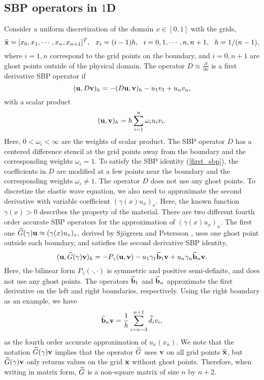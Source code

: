 \subsection{SBP operators in $1$D}\label{sec_sbp_1d}
Consider a uniform discretization of the domain $x\in[0,1]$ with the grids,
\[\widetilde
	{\bf x} = [x_0,x_1,\cdots,x_n,x_{n+1}]^T,\ \  x_i = (i-1)h,\ \ i = 0,1,\cdots,n,n+1,\ \ h = 1/(n-1),\]
where $i = 1,n$ correspond to the grid points on the boundary, and $i = 0,n+1$ are ghost points outside of the physical domain. The  operator $D \approx \frac{\partial }{\partial x}$ is a first derivative SBP operator \cite{Kreiss1974,Strand1994} if 
\begin{equation}\label{first_sbp}
({\bf u}, D{\bf v})_h = -(D{\bf u},{\bf v})_h - u_1v_1 + u_nv_n,
\end{equation}
with a scalar product
\begin{equation}\label{inner_product}
({\bf u},{\bf v})_h = h\sum_{i = 1}^{n}\omega_iu_iv_i.
\end{equation}
Here, $0<\omega_i < \infty $ are the weights of scalar product. The SBP operator $D$ has a centered difference stencil at the grid points away from the boundary and the corresponding weights $\omega_i = 1$. To satisfy the SBP identity (\ref{first_sbp}), the coefficients in $D$ are  modified at a few points near the boundary and the corresponding weights $\omega_i \neq 1$. The operator $D$ does not use any ghost points. To discretize the elastic wave equation, we also need to approximate the second derivative with variable coefficient $(\gamma(x)u_x)_x$. Here, the known function $\gamma(x)>0$ describes the property of the material. There are two different fourth order accurate SBP operators for the approximation of $(\gamma(x)u_x)_x$. The first one $\widetilde{G}(\gamma){\bf u} \approx (\gamma(x)u_x)_x $, derived by Sj\"ogreen and Petersson \cite{sjogreen2012fourth}, uses one ghost point outside each boundary, and satisfies the second derivative SBP identity,
\begin{equation}\label{sbp_2nd_1}
({\bf u}, \wt{G}(\gamma){\bf v})_h = -P_\gamma({\bf u},{\bf v})-u_1\gamma_1\wt{\bf b}_1{\bf v} + u_n\gamma_n\wt{\bf b}_n {\bf v}.
\end{equation}
Here, the bilinear form $P_\gamma(\cdot,\cdot)$ is symmetric and positive semi-definite, and does not use any ghost points. The operators $\widetilde{\bf b}_1$ and $\widetilde{\bf b}_n$ approximate the first derivative on the left and right boundaries, respectively. Using the right boundary as an example, we have 
\begin{equation}\label{sbp_1st_1}
\wt{\bf b}_n {\bf v} = \frac{1}{h}\sum_{i=n-3}^{n+1} \wt{d}_i v_i,
\end{equation}
as the fourth order accurate approximation of $u_x(x_n)$. We note that the notation $\widetilde{G}(\gamma){\bf v}$ implies that the operator $\widetilde{G}$ uses ${\bf v}$ on all grid points $\widetilde{\bf x}$, but $\widetilde{G}(\gamma){\bf v}$ only returns values on the grid ${\bf x}$ without ghost points. Therefore, when writing in matrix form, $\widetilde{G}$ is a non-square matrix of size $n$ by $n+2$.

